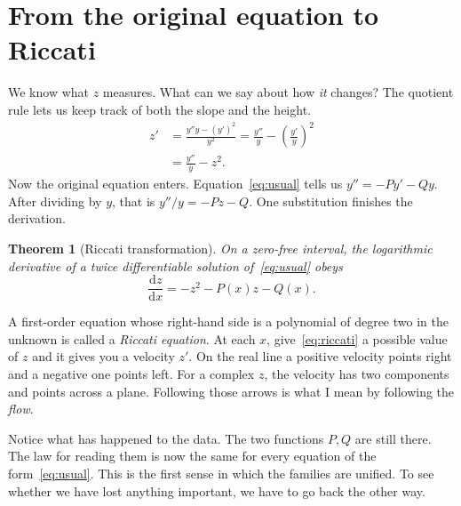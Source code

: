 \documentclass[11pt,a4paper]{amsart}
\newcommand{\dif}{\mathrm{d}}
\newtheorem{theorem}{Theorem}[section]
\theoremstyle{definition}
\theoremstyle{remark}
\begin{document}
\section{From the original equation to Riccati}
We know what \(z\) measures. What can we say about how \emph{it} changes? The quotient rule lets us keep track of both the slope and the height.
\begin{align*}
 z'&=\frac{y''y-(y')^2}{y^2}
     =\frac{y''}{y}-\left(\frac{y'}{y}\right)^2\\
   &=\frac{y''}{y}-z^2 .
\end{align*}
Now the original equation enters. Equation~\eqref{eq:usual} tells us \(y''=-Py'-Qy\). After dividing by \(y\), that is \(y''/y=-Pz-Q\). One substitution finishes the derivation.

\begin{theorem}[Riccati transformation]\label{thm:ode-to-riccati}
On a zero-free interval, the logarithmic derivative of a twice differentiable solution of~\eqref{eq:usual} obeys
\begin{equation}\label{eq:riccati}
 \frac{\dif z}{\dif x}=-z^2-P(x)z-Q(x).
\end{equation}
\end{theorem}
A first-order equation whose right-hand side is a polynomial of degree two in the unknown is called a \emph{Riccati equation}. At each \(x\), give~\eqref{eq:riccati} a possible value of \(z\) and it gives you a velocity \(z'\). On the real line a positive velocity points right and a negative one points left. For a complex \(z\), the velocity has two components and points across a plane. Following those arrows is what I mean by following the \emph{flow}.

Notice what has happened to the data. The two functions \(P,Q\) are still there. The law for reading them is now the same for every equation of the form~\eqref{eq:usual}. This is the first sense in which the families are unified. To see whether we have lost anything important, we have to go back the other way.
\end{document}
